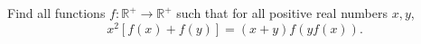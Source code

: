 Find all functions $f:\mathbb R^+ \rightarrow \mathbb R^+$ such that for all positive real numbers $x,y$,
\[x^2[f(x)+f(y)]=(x+y)f(yf(x)).\]